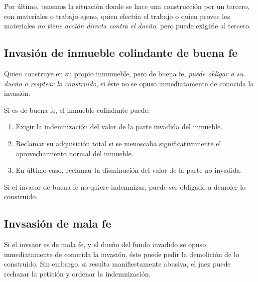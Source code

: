 \documentclass[../main.tex]{subfiles}
\begin{document}
Por último, tenemos la situación donde se hace una construcción por un tercero,
con materiales o trabajo ajeno, quien efectúa el trabajo o quien provee los
materiales \textit{no tiene acción directa contra el dueño}, pero puede exigirle
al tercero.

\subsection{Invasión de inmueble colindante de buena fe}

Quien construye en su propio inmmueble, pero de buena fe, \textit{puede obligar}
\textit{a su dueño a resptear lo construido}, si éste no se opuso inmediatamente
de conocida la invasión.

Si es de buena fe, el inmueble colindante puede:

\begin{enumerate}
  \item Exigir la indemnización del valor de la parte invadida del inmueble.
  \item Reclamar su adquisición total si se menoscaba significativamente el 
    aprovechamiento normal del inmueble.
  \item En último caso, reclamar la disminución del valor de la parte no 
    invadida.
\end{enumerate}

Si el invasor de buena fe no quiere indemnizar, puede ser obligado a demoler lo
construido.

\subsection{Invsasión de mala fe}

Si el invsaor es de mala fe, y el dueño del fundo invadido se opuso inmediatamente
de conocida la invasión, éste puede pedir la demolición de lo construido. Sin
embargo, si resulta manifiestamente abusiva, el juez puede rechazar la petición
y ordenar la indemnización.
\end{document}
